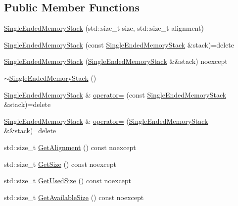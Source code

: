 \subsection*{Public Member Functions}
\begin{DoxyCompactItemize}
\item 
\mbox{\hyperlink{classmage_1_1_single_ended_memory_stack_a60be7cde487410ea16ab84e8630ccca2}{Single\+Ended\+Memory\+Stack}} (std\+::size\+\_\+t size, std\+::size\+\_\+t alignment)
\item 
\mbox{\hyperlink{classmage_1_1_single_ended_memory_stack_ae854c4558f0215bf38cb713cbca7fa31}{Single\+Ended\+Memory\+Stack}} (const \mbox{\hyperlink{classmage_1_1_single_ended_memory_stack}{Single\+Ended\+Memory\+Stack}} \&stack)=delete
\item 
\mbox{\hyperlink{classmage_1_1_single_ended_memory_stack_afd6632eac3ada6ea88a69b586f27a4e4}{Single\+Ended\+Memory\+Stack}} (\mbox{\hyperlink{classmage_1_1_single_ended_memory_stack}{Single\+Ended\+Memory\+Stack}} \&\&stack) noexcept
\item 
\mbox{\hyperlink{classmage_1_1_single_ended_memory_stack_adaa82d19a1ef60ca42396bdaaea0c8e6}{$\sim$\+Single\+Ended\+Memory\+Stack}} ()
\item 
\mbox{\hyperlink{classmage_1_1_single_ended_memory_stack}{Single\+Ended\+Memory\+Stack}} \& \mbox{\hyperlink{classmage_1_1_single_ended_memory_stack_a709db7d21cd2db6e98acd7985770468e}{operator=}} (const \mbox{\hyperlink{classmage_1_1_single_ended_memory_stack}{Single\+Ended\+Memory\+Stack}} \&stack)=delete
\item 
\mbox{\hyperlink{classmage_1_1_single_ended_memory_stack}{Single\+Ended\+Memory\+Stack}} \& \mbox{\hyperlink{classmage_1_1_single_ended_memory_stack_a24613dc91ab6577aa57fbd55a4c81023}{operator=}} (\mbox{\hyperlink{classmage_1_1_single_ended_memory_stack}{Single\+Ended\+Memory\+Stack}} \&\&stack)=delete
\item 
std\+::size\+\_\+t \mbox{\hyperlink{classmage_1_1_single_ended_memory_stack_a45496ec3a36d1acde8efd25cf0adf7d3}{Get\+Alignment}} () const noexcept
\item 
std\+::size\+\_\+t \mbox{\hyperlink{classmage_1_1_single_ended_memory_stack_a622a91fa2386f37d92ad915941930326}{Get\+Size}} () const noexcept
\item 
std\+::size\+\_\+t \mbox{\hyperlink{classmage_1_1_single_ended_memory_stack_acdc7e767f8306b2e073d438bcb54e54b}{Get\+Used\+Size}} () const noexcept
\item 
std\+::size\+\_\+t \mbox{\hyperlink{classmage_1_1_single_ended_memory_stack_a722743b5b9a94b60a375a71027bb70a5}{Get\+Available\+Size}} () const noexcept

\end{DoxyCompactItemize}
